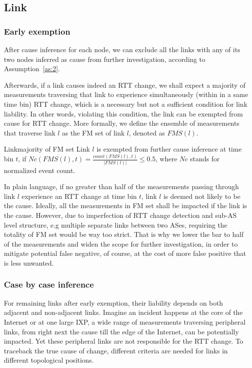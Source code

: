 \subsection{Link}

\subsubsection{Early exemption}

After cause inference for each node, we can exclude all the links with any of its two nodes inferred as cause from further investigation, according to Assumption~\ref{as:2}.

Afterwards, if a link causes indeed an RTT change, we shall expect a majority of measurements traversing that link to experience simultaneously (within in a same time bin) RTT change, which is a necessary but not a sufficient condition for link liability. In other words, violating this condition, the link can be exempted from cause for RTT change.
More formally, we define the ensemble of measurements that traverse link $l$ as the \acf{FM} set of link $l$, denoted as $FMS(l)$. 

\begin{heuristic}{Link}{majority of \ac{FM} set}\label{hu:link}
Link $l$ is exempted from further cause inference at time bin $t$, if $Nc(FMS(l), t) = \frac{count(FMS(l), t)}{|FMS(l)|} \leq 0.5$, where $Nc$ stands for normalized event count.
\end{heuristic}

In plain language, if no greater than half of the measurements passing through link $l$ experience an RTT change at time bin $t$, link $l$ is deemed not likely to be the cause. 
Ideally, all the measurements in \ac{FM} set shall be impacted if the link is the cause. However, due to imperfection of RTT change detection and sub-AS level structure, e.g multiple separate links between two ASes, requiring the totality of \ac{FM} set would be way too strict. That is why we lower the bar to half of the measurements and widen the scope for further investigation, in order to mitigate potential false negative, of course, at the cost of more false positive that is less unwanted.

\subsubsection{Case by case inference}

For remaining links after early exemption, their liability depends on both adjacent and non-adjacent links. Imagine an incident happens at the core of the Internet or at one large IXP, a wide range of measurements traversing peripheral links, from right next the cause till the edge of the Internet, can be potentially impacted. Yet these peripheral links are not responsible for the RTT change. 
To traceback the true cause of change, different criteria are needed for links in different topological positions.

